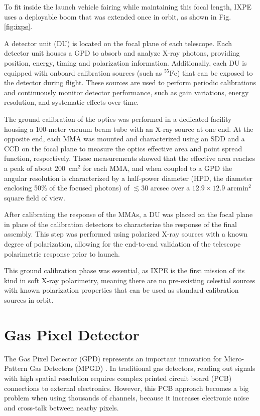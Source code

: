 To fit inside the launch vehicle fairing while maintaining this focal length, IXPE uses a deployable boom that was extended once in orbit, as shown in Fig. \ref{fig:ixpe}.

A detector unit (DU) is located on the focal plane of each telescope. Each detector unit houses a GPD to absorb and analyze X-ray photons, providing position, energy, timing and polarization information. Additionally, each DU is equipped with onboard calibration sources (such as $^{55}\text{Fe}$) that can be exposed to the detector during flight. These sources are used to perform periodic calibrations and continuously monitor detector performance, such as gain variations, energy resolution, and systematic effects over time.

The ground calibration of the optics was performed in a dedicated facility housing a 100-meter vacuum beam tube with an X-ray source at one end. At the opposite end, each MMA was mounted and characterized using an SDD and a CCD on the focal plane to measure the optics effective area and point spread function, respectively. These measurements showed that the effective area reaches a peak of about 200~cm$^2$ for each MMA, and when coupled to a GPD the angular resolution is characterized by a half-power diameter (HPD, the diameter enclosing 50\% of the focused photons) of $\lesssim 30$ arcsec over a $12.9 \times 12.9\text{ arcmin}^2$ square field of view.

After calibrating the response of the MMAs, a DU was placed on the focal plane in place of the calibration detectors to characterize the response of the final assembly. This step was performed using polarized X-ray sources with a known degree of polarization, allowing for the end-to-end validation of the telescope polarimetric response prior to launch.

This ground calibration phase was essential, as IXPE is the first mission of its kind in soft X-ray polarimetry, meaning there are no pre-existing celestial sources with known polarization properties that can be used as standard calibration sources in orbit.

\section{Gas Pixel Detector}

The Gas Pixel Detector (GPD) represents an important innovation for Micro-Pattern Gas Detectors (MPGD) \cite{bellazzini2004, bellazzini2006}. In traditional gas detectors, reading out signals with high spatial resolution requires complex printed circuit board (PCB) connections to external electronics. However, this PCB approach becomes a big problem when using thousands of channels, because it increases electronic noise and cross-talk between nearby pixels.

